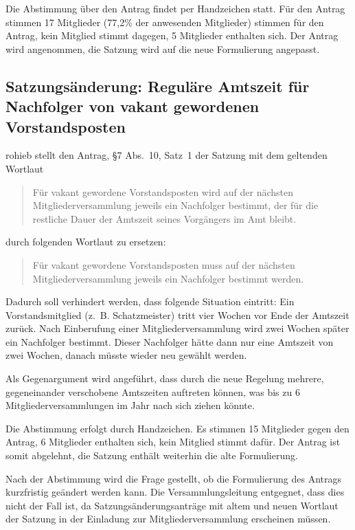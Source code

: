 \documentclass[a4paper,12pt]{scrartcl}
\begin{document}
Die Abstimmung über den Antrag findet per Handzeichen statt. Für den Antrag
stimmen 17 Mitglieder (77{,}2\% der anwesenden Mitglieder) stimmen für den
Antrag, kein Mitglied stimmt dagegen, 5 Mitglieder enthalten sich. Der
Antrag wird angenommen, die Satzung wird auf die neue Formulierung angepasst.

\subsection{Satzungsänderung: Reguläre Amtszeit für Nachfolger von vakant
gewordenen Vorstandsposten}

rohieb stellt den Antrag, §7 Abs.~10, Satz~1 der Satzung mit dem geltenden
Wortlaut
\begin{quote}
  Für vakant gewordene Vorstandsposten wird auf der nächsten
  Mitgliederversammlung jeweils ein Nachfolger bestimmt, der für die restliche
  Dauer der Amtszeit seines Vorgängers im Amt bleibt.
\end{quote}
durch folgenden Wortlaut zu ersetzen:
\begin{quote}
  Für vakant gewordene Vorstandsposten muss auf der nächsten
  Mitgliederversammlung jeweils ein Nachfolger bestimmt werden.
\end{quote}

Dadurch soll verhindert werden, dass folgende Situation eintritt: Ein
Vorstandsmitglied (z.~B. Schatzmeister) tritt vier Wochen vor Ende der Amtszeit
zurück. Nach Einberufung einer Mitgliederversammlung wird zwei Wochen später ein
Nachfolger bestimmt. Dieser Nachfolger hätte dann nur eine Amtszeit von zwei
Wochen, danach müsste wieder neu gewählt werden.

Als Gegenargument wird angeführt, dass durch die neue Regelung mehrere,
gegeneinander verschobene Amtszeiten auftreten können, was bis zu 6
Mitgliederversammlungen im Jahr nach sich ziehen könnte.

Die Abstimmung erfolgt durch Handzeichen. Es stimmen 15 Mitglieder gegen den
Antrag, 6 Mitglieder enthalten sich, kein Mitglied stimmt dafür. Der Antrag ist
somit abgelehnt, die Satzung enthält weiterhin die alte Formulierung.

Nach der Abstimmung wird die Frage gestellt, ob die Formulierung des Antrags
kurzfristig geändert werden kann. Die Versammlungsleitung entgegnet, dass dies
nicht der Fall ist, da Satzungsänderungsanträge mit altem und neuen Wortlaut der
Satzung in der Einladung zur Mitgliederversammlung erscheinen müssen.
\end{document}
